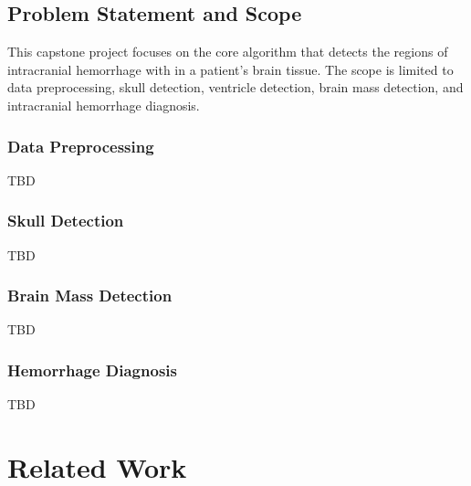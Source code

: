 \documentclass [11pt, proquest] {uwthesis}[2020/02/24]
\begin{document}
\section{Problem Statement and Scope}
This capstone project focuses on the core algorithm that detects the regions of intracranial
hemorrhage with in a patient's brain tissue. The scope is limited to data preprocessing, skull detection,
ventricle detection, brain mass detection, and intracranial hemorrhage diagnosis.

\subsection{Data Preprocessing}

TBD

\subsection{Skull Detection}

TBD

\subsection{Brain Mass Detection}

TBD

\subsection{Hemorrhage Diagnosis}

TBD



\chapter {Related Work}
\end{document}
